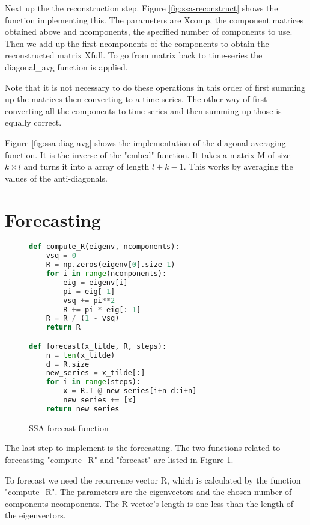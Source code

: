 Next up the the reconstruction step. Figure \ref{fig:ssa-reconstruct} shows the function implementing this. The parameters are Xcomp, the component matrices obtained above and ncomponents, the specified number of components to use. Then we add up the first ncomponents of the components to obtain the reconstructed matrix Xfull. To go from matrix back to time-series the diagonal\_avg function is applied. 

Note that it is not necessary to do these operations in this order of first summing up the matrices then converting to a time-series. The other way of first converting all the components to time-series and then summing up those is equally correct. 

Figure \ref{fig:ssa-diag-avg} shows the implementation of the diagonal averaging function. It is the inverse of the "embed" function. It takes a matrix M of size $k \times l$ and turns it into a array of length $l+k-1$. This works by averaging the values of the anti-diagonals. 

\section{Forecasting}

\begin{figure}
\begin{singlespace}
\begin{lstlisting}[language=Python]
def compute_R(eigenv, ncomponents):
    vsq = 0
    R = np.zeros(eigenv[0].size-1)
    for i in range(ncomponents):
        eig = eigenv[i]
        pi = eig[-1]
        vsq += pi**2
        R += pi * eig[:-1]
    R = R / (1 - vsq)
    return R

def forecast(x_tilde, R, steps):
    n = len(x_tilde)
    d = R.size
    new_series = x_tilde[:]
    for i in range(steps):
        x = R.T @ new_series[i+n-d:i+n]
        new_series += [x]
    return new_series
\end{lstlisting}
\end{singlespace}
\caption{SSA forecast function}    
\label{fig:ssa-forecast}
\end{figure}

The last step to implement is the forecasting. The two functions related to forecasting "compute\_R" and "forecast" are listed in Figure \ref{fig:ssa-forecast}. 

To forecast we need the recurrence vector R, which is calculated by the function "compute\_R". The parameters are the eigenvectors and the chosen number of components ncomponents. The R vector's length is one less than the length of the eigenvectors. 

